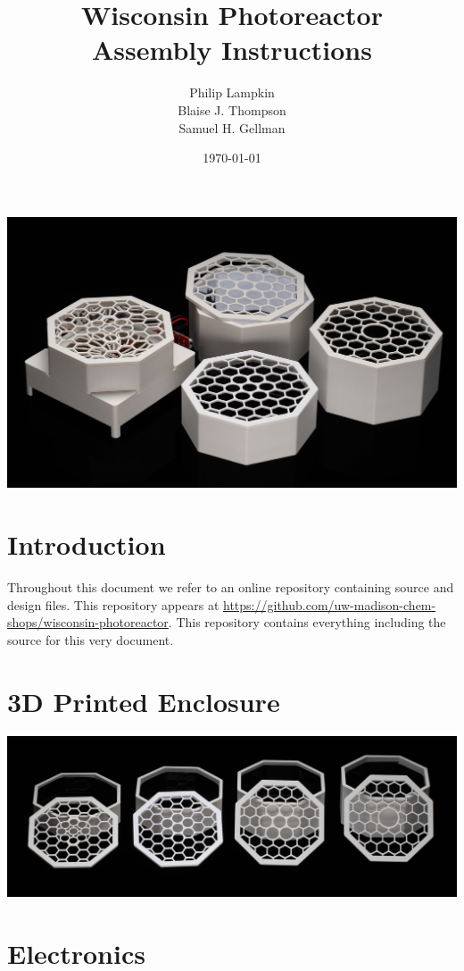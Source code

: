 \documentclass[11pt]{article}
\title{Wisconsin Photoreactor \\ Assembly Instructions}
\author{
  Philip Lampkin \\
  Blaise J. Thompson \\
  Samuel H. Gellman
  }
\date{\today}
\let\stdsection\section
\renewcommand\section{\clearpage\stdsection}
\begin{document}
\maketitle

\includegraphics[width=\textwidth]{"../coverart.jpg"}

\tableofcontents

\section{Introduction}

Throughout this document we refer to an online repository containing source and design files.
This repository appears at \url{https://github.com/uw-madison-chem-shops/wisconsin-photoreactor}.
This repository contains everything including the source for this very document.

\section{3D Printed Enclosure}

\includegraphics[width=\textwidth]{"./3dp-coverat.jpg"}

\section{Electronics}
\end{document}
